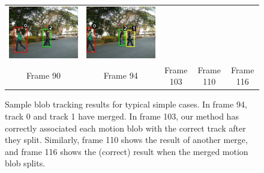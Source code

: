 \begin{figure}[t]
\begin{center}
\begin{tabular}{ccccc}
      \includegraphics[scale=0.21]{figures/normal-tracking-result-0110.pdf} &
      \includegraphics[scale=0.21]{figures/normal-tracking-result-0116.pdf} 
      \\
      \small Frame 90 & 
      \small Frame 94 & 
      \small Frame 103 & 
      \small Frame 110 & 
      \small Frame 116
    \end{tabular}
  \end{center}
  \caption[Sample blob tracking results for typical simple
    cases]{\small Sample blob tracking results for typical simple
    cases. In frame 94, track 0 and track 1 have merged.  In frame
    103, our method has correctly associated each motion blob with the
    correct track after they split. Similarly, frame 110 shows the
    result of another merge, and frame 116 shows the (correct) result
    when the merged motion blob splits.}
  \label{fig:normal-tracking-results}
\end{figure}

